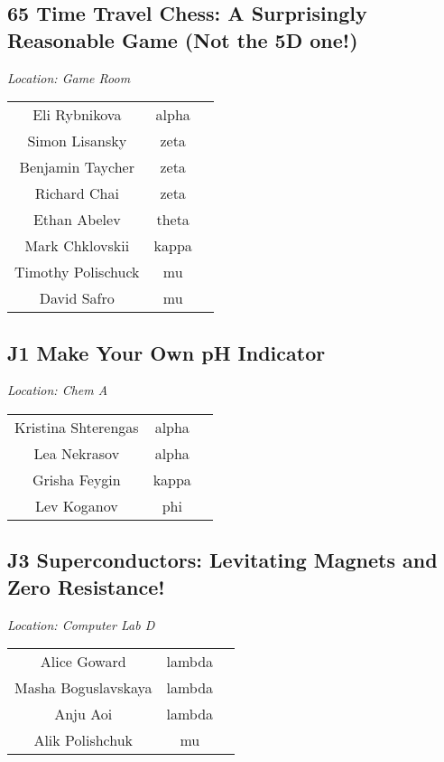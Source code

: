 \documentclass{article}
\begin{document}
\begin{center}
\section*{65 Time Travel Chess: A Surprisingly Reasonable Game (Not the 5D one!)}
\end{center}
\begin{center}
\textit{Location: Game Room}
\end{center}
\setlength{\tabcolsep}{60pt}
\centering
\begin{tabular}{c c c}
Eli Rybnikova & alpha \\
Simon Lisansky & zeta \\
Benjamin Taycher & zeta \\
Richard Chai & zeta \\
Ethan Abelev & theta \\
Mark Chklovskii & kappa \\
Timothy Polischuck & mu \\
David Safro & mu \\
\end{tabular}
\begin{center}
\section*{J1 Make Your Own pH Indicator}
\end{center}
\begin{center}
\textit{Location: Chem A}
\end{center}
\setlength{\tabcolsep}{60pt}
\centering
\begin{tabular}{c c c}
Kristina Shterengas & alpha \\
Lea Nekrasov & alpha \\
Grisha Feygin & kappa \\
Lev Koganov & phi \\
\end{tabular}
\pagebreak
\begin{center}
\section*{J3 Superconductors: Levitating Magnets and Zero Resistance!}
\end{center}
\begin{center}
\textit{Location: Computer Lab D}
\end{center}
\setlength{\tabcolsep}{60pt}
\centering
\begin{tabular}{c c c}
Alice Goward & lambda \\
Masha Boguslavskaya & lambda \\
Anju Aoi & lambda \\
Alik Polishchuk & mu \\
\end{tabular}
\end{document}
